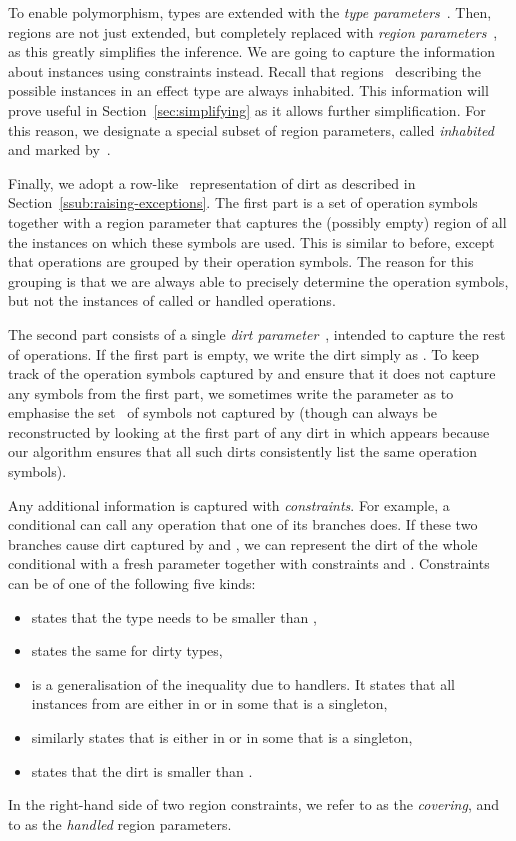 \documentclass{LMCS}
\begin{document}
To enable polymorphism, types are extended with the \emph{type parameters}~.
Then, regions are not just extended,
but completely replaced with \emph{region parameters}~,
as this greatly simplifies the inference.
We are going to capture the information about instances using constraints instead.
Recall that regions~ describing the possible instances in an effect type  are always inhabited.
This information will prove useful in Section~\ref{sec:simplifying} as it allows further simplification.
For this reason, we designate a special subset of region parameters, called \emph{inhabited} and marked by~.

Finally, we adopt a row-like~\cite{remy1993type} representation of dirt as described in Section~\ref{ssub:raising-exceptions}.
The first part is a set of operation symbols together with a region parameter
that captures the (possibly empty) region of all the instances on which these symbols are used.
This is similar to before, except that operations are grouped by their operation symbols.
The reason for this grouping is that we are always able to precisely determine the operation symbols,
but not the instances of called or handled operations.

The second part consists of a single \emph{dirt parameter}~,
intended to capture the rest of operations.
If the first part is empty, we write the dirt simply as .
To keep track of the operation symbols captured by 
and ensure that it does not capture any symbols from the first part,
we sometimes write the parameter as 
to emphasise the set~ of symbols not captured by 
(though  can always be reconstructed by looking
at the first part of any dirt in which  appears
because our algorithm ensures that all such dirts consistently list the same operation symbols).

Any additional information is captured with \emph{constraints}.
For example, a conditional can call any operation that one of its branches does.
If these two branches cause dirt captured by  and ,
we can represent the dirt of the whole conditional with a fresh parameter 
together with constraints  and .
Constraints can be of one of the following five kinds:
\begin{itemize}
\item
   states that the type  needs to be smaller than ,
\item
   states the same for dirty types,
\item
   is a generalisation of the inequality  due to handlers.
  It states that all instances from  are either in  or in some  that is a singleton,
\item
   similarly states that  is either in  or in some  that is a singleton,
\item
   states that the dirt  is smaller than .
\end{itemize}
In the right-hand side  of two region constraints,
we refer to  as the \emph{covering},
and to  as the \emph{handled} region parameters.
\end{document}
